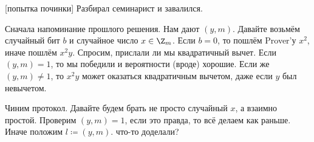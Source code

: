 [попытка починки]
	Разбирал семинарист и завалился.

	Сначала напоминание прошлого решения.
	Нам дают $(y, m)$.
	Давайте возьмём случайный бит $b$ и случайное число $x \in \Z_m$.
	Если $b=0$, то пошлём Prover'у $x^2$, иначе пошлём $x^2y$.
	Спросим, прислали ли мы квадратичный вычет.
	Если $(y, m) = 1$, то мы победили и вероятности (вроде) хорошие.
	Если же $(y, m) \neq 1$, то $x^2y$ может оказаться квадратичным вычетом, даже если $y$ был невычетом.

	Чиним протокол.
	Давайте будем брать не просто случайный $x$, а взаимно простой.
	Проверим $(y, m)=1$, если это правда, то всё делаем как раньше.
	Иначе положим $l\coloneq (y, m)$.
	\TODO что-то доделали?
